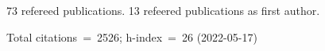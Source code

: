 73 refereed publications. 13 refeered publications as first author.

Total citations~=~2526; h-index~=~26 (2022-05-17)